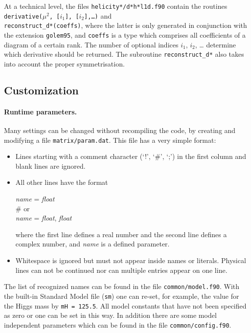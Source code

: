 \documentclass[11pt,a4paper]{refrep}
\begin{document}
At a technical level, 
the files \texttt{helicity*/d*h*l1d.f90} contain the routines
\texttt{derivative($\mu^2$, [$i_1$], [$i_2$],\dots)} and\\
\texttt{reconstruct\_d*(coeffs)}, where the latter is only generated in
conjunction with the extension \texttt{golem95}, and \texttt{coeffs} is
a type which comprises all coefficients of a diagram of a certain rank.
The number of optional indices $i_1$, $i_2$, \dots 
determine which derivative should be returned. The subroutine
\texttt{reconstruct\_d*} also takes into account the proper symmetrisation.

\subsection{Customization}\label{sec:Customization}
\paragraph{Runtime parameters.}
Many settings can be changed without recompiling the code, by
creating and modifying a file \texttt{matrix/param.dat}.
This file has a very simple format:
\begin{itemize}
\item Lines starting with a comment character (`!', `\#', `;')
      in the first column and blank lines are ignored.
\item All other lines have the format
\begin{example}
\textit{name} = \textit{float}\\
\# \textrm{or}\\
\textit{name} = \textit{float}, \textit{float}
\end{example}
      where the first line defines a real number and the second
      line defines a complex number, and \textit{name} is a defined
      parameter.
\item Whitespace is ignored but must not appear inside names or
      literals. Physical lines can not be continued nor can
      multiple entries appear on one line.
\end{itemize}
The list of recognized names can be found in the file
\texttt{common/model.f90}. 
With the built-in Standard Model file (\texttt{sm}) one
can re-set, for example, the value for the Higgs mass by 
{\tt mH = 125.5}.
All model constants that have not been specified as zero or one
can be set in this way. 
In addition there are some model independent parameters which can be found in the file 
\texttt{common/config.f90}.
\end{document}

